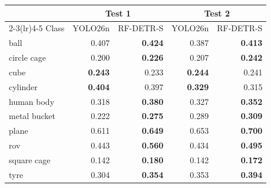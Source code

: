 \begin{tabular}{lrrrr}
\toprule
 & \multicolumn{2}{c}{Test 1} & \multicolumn{2}{c}{Test 2} \\
\cmidrule(lr){2-3}\cmidrule(lr){4-5}
Class & YOLO26n & RF-DETR-S & YOLO26n & RF-DETR-S \\
\midrule
ball & 0.407 & \textbf{0.424} & 0.387 & \textbf{0.413} \\
circle cage & 0.200 & \textbf{0.226} & 0.207 & \textbf{0.242} \\
cube & \textbf{0.243} & 0.233 & \textbf{0.244} & 0.241 \\
cylinder & \textbf{0.404} & 0.397 & \textbf{0.329} & 0.315 \\
human body & 0.318 & \textbf{0.380} & 0.327 & \textbf{0.352} \\
metal bucket & 0.222 & \textbf{0.275} & 0.289 & \textbf{0.309} \\
plane & 0.611 & \textbf{0.649} & 0.653 & \textbf{0.700} \\
rov & 0.443 & \textbf{0.560} & 0.434 & \textbf{0.495} \\
square cage & 0.142 & \textbf{0.180} & 0.142 & \textbf{0.172} \\
tyre & 0.304 & \textbf{0.354} & 0.353 & \textbf{0.394} \\
\bottomrule
\end{tabular}
